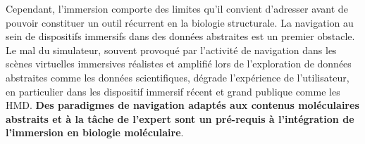 

Cependant, l'immersion comporte des limites qu'il convient d'adresser avant de pouvoir constituer un outil récurrent en la biologie structurale. La navigation au sein de dispositifs immersifs dans des données abstraites est un premier obstacle. Le mal du simulateur, souvent provoqué par l'activité de navigation dans les scènes virtuelles immersives réalistes et amplifié lors de l'exploration de données abstraites comme les données scientifiques, dégrade l'expérience de l'utilisateur, en particulier dans les dispositif immersif récent et grand publique comme les HMD. \textbf{Des paradigmes de navigation adaptés aux contenus moléculaires abstraits et à la tâche de l'expert sont un pré-requis à l'intégration de l'immersion en biologie moléculaire}.

